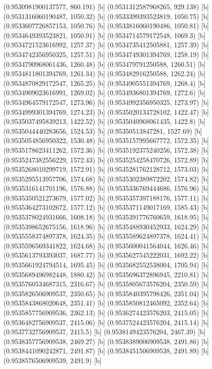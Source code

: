 {{{(0.9530981900137577, 860.191) [b] 
(0.9531312587968265, 929.138) [b] 
(0.9531316060190487, 1050.32) [b] 
(0.9533399393523819, 1050.75) [b] 
(0.9533607726857153, 1050.76) [b] 
(0.9533816060190486, 1050.81) [b] 
(0.9534649393523821, 1050.91) [b] 
(0.9534714579172548, 1069.3) [b] 
(0.9534721523616992, 1257.37) [b] 
(0.9534735412505881, 1257.39) [b] 
(0.9534742356950325, 1257.51) [b] 
(0.9534749301394769, 1258.19) [b] 
(0.9534790968061436, 1260.48) [b] 
(0.953479791250588, 1260.51) [b] 
(0.9534811801394769, 1261.34) [b] 
(0.953482916250588, 1262.24) [b] 
(0.9534870829172547, 1265.25) [b] 
(0.9534905551394769, 1268.4) [b] 
(0.9534909023616991, 1269.02) [b] 
(0.9534936801394769, 1272.6) [b] 
(0.9534964579172547, 1273.96) [b] 
(0.9534992356950325, 1273.97) [b] 
(0.9534999301394769, 1274.23) [b] 
(0.9535020134728102, 1422.47) [b] 
(0.9535037495839213, 1422.52) [b] 
(0.9535040968061435, 1422.8) [b] 
(0.9535044440283656, 1524.53) [b] 
(0.95350513847281, 1527.69) [b] 
(0.9535054856950322, 1530.48) [b] 
(0.9535157995667772, 1572.35) [b] 
(0.9535178623411262, 1572.36) [b] 
(0.9535192375240256, 1572.38) [b] 
(0.9535247382556229, 1572.43) [b] 
(0.9535254258470726, 1572.89) [b] 
(0.9535268010299719, 1572.91) [b] 
(0.9535281762128712, 1573.03) [b] 
(0.9535295513957706, 1574.68) [b] 
(0.9535302389872202, 1574.82) [b] 
(0.9535316141701196, 1576.88) [b] 
(0.9535336769444686, 1576.96) [b] 
(0.9535350521273679, 1577.02) [b] 
(0.9535357397188176, 1577.11) [b] 
(0.9535364273102672, 1577.12) [b] 
(0.9535371149017169, 1585.43) [b] 
(0.9535378024931666, 1608.18) [b] 
(0.9535391776760659, 1618.95) [b] 
(0.9535398652675156, 1618.96) [b] 
(0.9535488930452933, 1624.29) [b] 
(0.9535558374897378, 1624.35) [b] 
(0.9535589624897378, 1624.41) [b] 
(0.9535596569341822, 1624.68) [b] 
(0.9535600041564044, 1626.46) [b] 
(0.9535613793393037, 1687.77) [b] 
(0.9535627545222031, 1692.22) [b] 
(0.9535661924794514, 1695.45) [b] 
(0.9535682552538004, 1705.94) [b] 
(0.9535689496982448, 1880.42) [b] 
(0.9535696372896945, 2210.81) [b] 
(0.9535760534687315, 2316.67) [b] 
(0.9535805673576204, 2350.59) [b] 
(0.9535826506909537, 2350.65) [b] 
(0.9535840395798426, 2351.04) [b] 
(0.9535843868020648, 2351.41) [b] 
(0.9535850812465092, 2352.64) [b] 
(0.9535857756909536, 2362.13) [b] 
(0.9536274423576203, 2415.05) [b] 
(0.9536482756909537, 2415.06) [b] 
(0.9537524423576204, 2415.14) [b] 
(0.9537732756909537, 2415.5) [b] 
(0.9538149423576204, 2467.39) [b] 
(0.9538357756909538, 2469.27) [b] 
(0.9538389006909538, 2491.86) [b] 
(0.9538441090242871, 2491.87) [b] 
(0.9538451506909538, 2491.89) [b] 
(0.9538576506909539, 2491.9) [b] 
}}}
